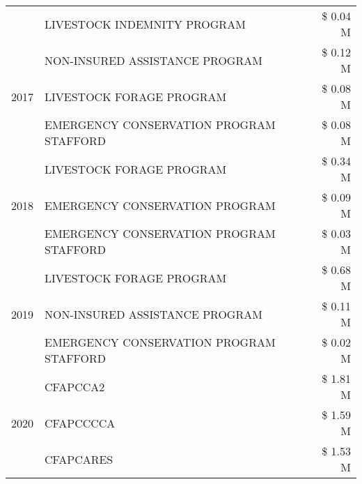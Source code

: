 \begin{tabular}{llr}
 & LIVESTOCK INDEMNITY PROGRAM & \$ 0.04 M \\
\cline{1-3}
\multirow[t]{3}{*}{2017} & NON-INSURED ASSISTANCE PROGRAM & \$ 0.12 M \\
 & LIVESTOCK FORAGE PROGRAM & \$ 0.08 M \\
 & EMERGENCY CONSERVATION PROGRAM STAFFORD & \$ 0.08 M \\
\cline{1-3}
\multirow[t]{3}{*}{2018} & LIVESTOCK FORAGE PROGRAM & \$ 0.34 M \\
 & EMERGENCY CONSERVATION PROGRAM & \$ 0.09 M \\
 & EMERGENCY CONSERVATION PROGRAM STAFFORD & \$ 0.03 M \\
\cline{1-3}
\multirow[t]{3}{*}{2019} & LIVESTOCK FORAGE PROGRAM & \$ 0.68 M \\
 & NON-INSURED ASSISTANCE PROGRAM & \$ 0.11 M \\
 & EMERGENCY CONSERVATION PROGRAM STAFFORD & \$ 0.02 M \\
\cline{1-3}
\multirow[t]{3}{*}{2020} & CFAPCCA2 & \$ 1.81 M \\
 & CFAPCCCCA & \$ 1.59 M \\
 & CFAPCARES & \$ 1.53 M \\
\cline{1-3}
\bottomrule
\end{tabular}
